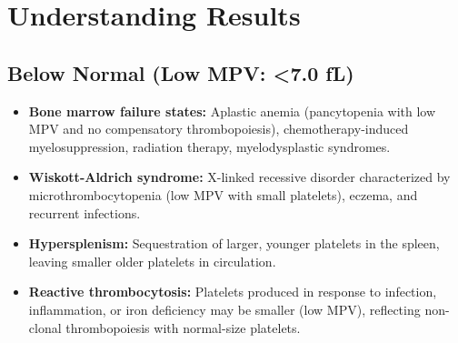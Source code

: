 \section*{Understanding Results}

\subsection*{Below Normal (Low MPV: <7.0 fL)}
\begin{itemize}
  \item \textbf{Bone marrow failure states:} Aplastic anemia (pancytopenia with low MPV and no compensatory thrombopoiesis), chemotherapy-induced myelosuppression, radiation therapy, myelodysplastic syndromes.
  \item \textbf{Wiskott-Aldrich syndrome:} X-linked recessive disorder characterized by microthrombocytopenia (low MPV with small platelets), eczema, and recurrent infections.
  \item \textbf{Hypersplenism:} Sequestration of larger, younger platelets in the spleen, leaving smaller older platelets in circulation.
  \item \textbf{Reactive thrombocytosis:} Platelets produced in response to infection, inflammation, or iron deficiency may be smaller (low MPV), reflecting non-clonal thrombopoiesis with normal-size platelets.
\end{itemize}

